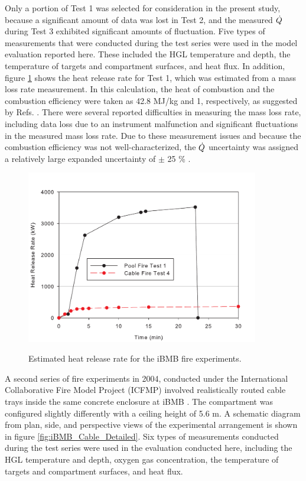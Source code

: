  Only a portion of Test 1 was selected for consideration in the present study, because a significant amount of data was lost in Test 2, and the measured ${\dot{Q}}$  during Test 3 exhibited significant amounts of fluctuation. Five types of measurements that were conducted during the test series were used in the model evaluation reported here.  These included the HGL temperature and depth, the temperature of targets and compartment surfaces, and heat flux. In addition, figure \ref{fig:iBMB_HRR} shows the heat release rate for Test 1, which was estimated from a mass loss rate measurement.  In this calculation, the heat of combustion and the combustion efficiency were taken as 42.8 MJ/kg and 1, respectively, as suggested by Refs. \cite{NRCNUREG1824Experimental, Riese:2004}.  There were several reported difficulties in measuring the mass loss rate, including data loss due to an instrument malfunction and significant fluctuations in the measured mass loss rate. Due to these measurement issues and because the combustion efficiency was not well-characterized, the ${\dot{Q}}$ uncertainty was assigned a relatively large expanded uncertainty of $\pm$ 25 \% \cite{NRCNUREG1824Experimental}.
 
 \begin{figure}
\begin{center}
\includegraphics[width=4.0in]{FIGURES/iBMB/iBMB_HRR}\\
\end{center}
\caption{Estimated heat release rate for the iBMB fire experiments.}
 \label{fig:iBMB_HRR}
\end{figure}

A second series of fire experiments in 2004, conducted under the International Collaborative Fire Model Project (ICFMP) involved realistically routed cable
trays inside the same concrete enclosure at iBMB \cite{Riese:2004}. The compartment was configured slightly differently with a ceiling height of 5.6 m. A schematic diagram from plan, side, and perspective views of the experimental arrangement is shown in figure \ref{fig:iBMB_Cable_Detailed}. Six types of measurements conducted during the test series were used in the evaluation conducted here, including the HGL temperature and depth, oxygen gas concentration, the temperature of targets and compartment surfaces, and heat flux.

